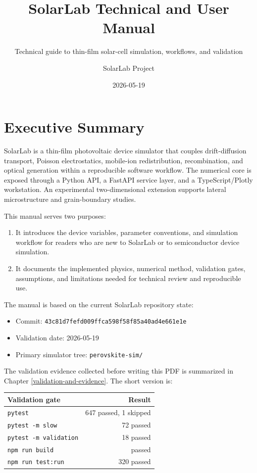 \documentclass[
  11pt,
  american,
]{report}
\title{SolarLab Technical and User Manual}
\subtitle{Technical guide to thin-film solar-cell simulation, workflows,
and validation}
\author{SolarLab Project}
\date{2026-05-19}
\providecommand{\tightlist}{%
  \setlength{\itemsep}{0pt}\setlength{\parskip}{0pt}}
\begin{document}
\maketitle

{
\hypersetup{linkcolor=}
\setcounter{tocdepth}{2}
\tableofcontents
}
\listoftables
\listoffigures
\newpage

\hypertarget{executive-summary}{%
\chapter{Executive Summary}\label{executive-summary}}

SolarLab is a thin-film photovoltaic device simulator that couples
drift-diffusion transport, Poisson electrostatics, mobile-ion
redistribution, recombination, and optical generation within a
reproducible software workflow. The numerical core is exposed through a
Python API, a FastAPI service layer, and a TypeScript/Plotly
workstation. An experimental two-dimensional extension supports lateral
microstructure and grain-boundary studies.

This manual serves two purposes:

\begin{enumerate}
\def\labelenumi{\arabic{enumi}.}
\tightlist
\item
  It introduces the device variables, parameter conventions, and
  simulation workflow for readers who are new to SolarLab or to
  semiconductor device simulation.
\item
  It documents the implemented physics, numerical method, validation
  gates, assumptions, and limitations needed for technical review and
  reproducible use.
\end{enumerate}

The manual is based on the current SolarLab repository state:

\begin{itemize}
\tightlist
\item
  Commit: \texttt{43c81d7fefd009ffca598f58f85a40ad4e661e1e}
\item
  Validation date: 2026-05-19
\item
  Primary simulator tree: \texttt{perovskite-sim/}
\end{itemize}

The validation evidence collected before writing this PDF is summarized
in Chapter \ref{validation-and-evidence}. The short version is:

\begin{longtable}[]{@{}lr@{}}
\toprule
Validation gate & Result \\
\midrule
\endhead
\texttt{pytest} & 647 passed, 1 skipped \\
\texttt{pytest\ -m\ slow} & 72 passed \\
\texttt{pytest\ -m\ validation} & 18 passed \\
\texttt{npm\ run\ build} & passed \\
\texttt{npm\ run\ test:run} & 320 passed \\
\bottomrule
\end{longtable}
\end{document}
